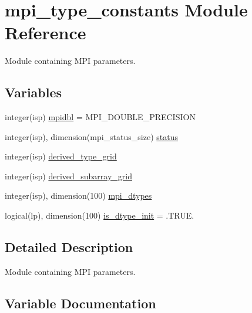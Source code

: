 \hypertarget{namespacempi__type__constants}{}\section{mpi\+\_\+type\+\_\+constants Module Reference}
\label{namespacempi__type__constants}


Module containing M\+PI parameters.  


\subsection*{Variables}
\begin{DoxyCompactItemize}
\item 
integer(isp) \hyperlink{namespacempi__type__constants_a19270446a7b267fa3b13821e93b1744f}{mpidbl} = M\+P\+I\+\_\+\+D\+O\+U\+B\+L\+E\+\_\+\+P\+R\+E\+C\+I\+S\+I\+ON
\item 
integer(isp), dimension(mpi\+\_\+status\+\_\+size) \hyperlink{namespacempi__type__constants_a364a6ee99d8c7ba31bde4f8d2108beaa}{status}
\item 
integer(isp) \hyperlink{namespacempi__type__constants_a4463600d2b1297b8b25562589ae2ed28}{derived\+\_\+type\+\_\+grid}
\item 
integer(isp) \hyperlink{namespacempi__type__constants_ad3a88774f5b3d027503997955c593325}{derived\+\_\+subarray\+\_\+grid}
\item 
integer(isp), dimension(100) \hyperlink{namespacempi__type__constants_a17a815d34db410fbd4e9591e3a0fdd96}{mpi\+\_\+dtypes}
\item 
logical(lp), dimension(100) \hyperlink{namespacempi__type__constants_a9a7750e86add91334ea455e5eb1516e6}{is\+\_\+dtype\+\_\+init} = .T\+R\+U\+E.
\end{DoxyCompactItemize}


\subsection{Detailed Description}
Module containing M\+PI parameters. 

\subsection{Variable Documentation}
